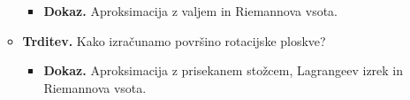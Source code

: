 \begin{enumerate}
\begin{itemize}
\begin{itemize}
            \item \colorbox{green!30}{\textbf{Dokaz.}} Aproksimacija z valjem in Riemannova vsota.
        \end{itemize} 
        \item \colorbox{blue!30}{\textbf{Trditev.}} Kako izračunamo površino rotacijske ploskve?
        \begin{itemize}
            \item \colorbox{green!30}{\textbf{Dokaz.}} Aproksimacija z prisekanem stožcem, Lagrangeev izrek in Riemannova vsota.
        \end{itemize} 
    \end{itemize}
\end{enumerate}
